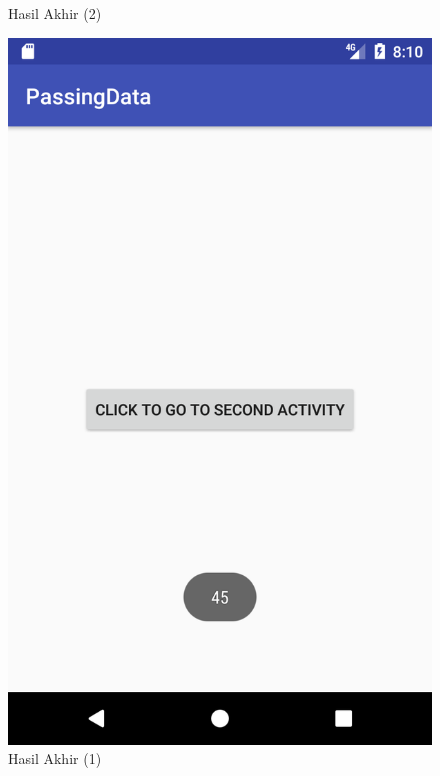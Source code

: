 \documentclass{scrartcl}
\begin{document}
\begin{enumerate}
\begin{figure}[htbp]
\begin{minipage}{.5\textwidth}
			\caption{Hasil Akhir (2)}
			\label{fig:screenshot_1496841052}
		\end{minipage}
	\end{figure}

	\begin{figure}[htbp]
		\begin{minipage}{.5\textwidth}
			\centering
			\includegraphics[width=0.7\linewidth]{Screenshot_1496841055}
			\caption{Hasil Akhir (1)}
			\label{fig:screenshot_1496841055}
		\end{minipage}
		\begin{minipage}{.5\textwidth}
			\centering

\end{minipage}
\end{figure}
\end{enumerate}
\end{document}
